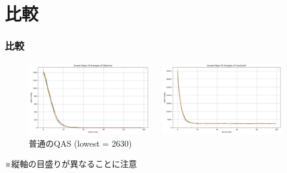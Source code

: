 \section{比較}
\begin{frame}
  \frametitle{比較}
  \begin{figure}
    \begin{columns}
      \begin{column}{0.47\linewidth}
        \includegraphics[width=1\linewidth]{data/GC_ene.png}
        \caption{Swap basedのQAS (lowest = 0)}        
      \end{column}
      \begin{column}{0.47\linewidth}
        \includegraphics[width=1\linewidth]{data/GC_onehot_ene.png}
        \caption{普通のQAS (lowest = 2630)}
      \end{column}
    \end{columns}
  \end{figure}
  ※縦軸の目盛りが異なることに注意
\end{frame}

